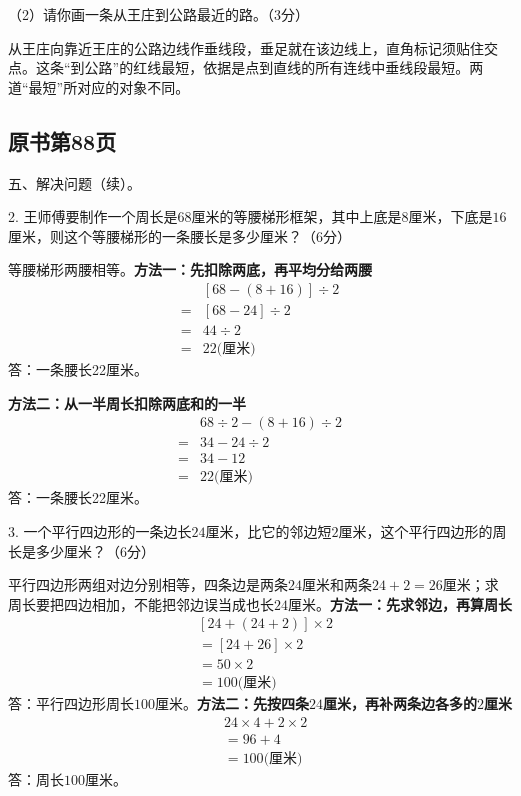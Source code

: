 （2）请你画一条从王庄到公路最近的路。（3分）\par
{}
\begin{BookAnswer}
从王庄向靠近王庄的公路边线作垂线段，垂足就在该边线上，直角标记须贴住交点。这条“到公路”的红线最短，依据是点到直线的所有连线中垂线段最短。两道“最短”所对应的对象不同。
\end{BookAnswer}



\subsection*{原书第88页}

五、解决问题（续）。\par 2. 王师傅要制作一个周长是\(68\)厘米的等腰梯形框架，其中上底是\(8\)厘米，下底是\(16\)厘米，则这个等腰梯形的一条腰长是多少厘米？（6分）\par
\begin{BookAnswer}
等腰梯形两腰相等。\textbf{方法一：先扣除两底，再平均分给两腰}\[\begin{aligned}&[68-(8+16)]\div2\\={}&[68-24]\div2\\={}&44\div2\\={}&22\text{(厘米)}\end{aligned}\]答：一条腰长22厘米。\par\textbf{方法二：从一半周长扣除两底和的一半}\[\begin{aligned}&68\div2-(8+16)\div2\\={}&34-24\div2\\={}&34-12\\={}&22\text{(厘米)}\end{aligned}\]答：一条腰长22厘米。
\end{BookAnswer}

3. 一个平行四边形的一条边长\(24\)厘米，比它的邻边短\(2\)厘米，这个平行四边形的周长是多少厘米？（6分）\par
\begin{BookAnswer}
平行四边形两组对边分别相等，四条边是两条\(24\)厘米和两条\(24+2=26\)厘米；求周长要把四边相加，不能把邻边误当成也长\(24\)厘米。\textbf{方法一：先求邻边，再算周长}\[\begin{aligned}&[24+(24+2)]\times2\\&=[24+26]\times2\\&=50\times2\\&=100\text{(厘米)}\end{aligned}\]答：平行四边形周长\(100\)厘米。\textbf{方法二：先按四条\(24\)厘米，再补两条边各多的\(2\)厘米}\[\begin{aligned}&24\times4+2\times2\\&=96+4\\&=100\text{(厘米)}\end{aligned}\]答：周长\(100\)厘米。
\end{BookAnswer}

